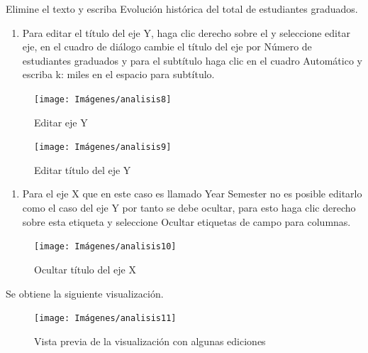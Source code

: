 \documentclass[
]{book}
\providecommand{\tightlist}{%
  \setlength{\itemsep}{0pt}\setlength{\parskip}{0pt}}
\begin{document}
Elimine el texto y escriba Evolución histórica del total de estudiantes graduados.

\begin{enumerate}
\def\labelenumi{\arabic{enumi}.}
\setcounter{enumi}{5}
\tightlist
\item
  Para editar el título del eje Y, haga clic derecho sobre el y seleccione editar eje, en el cuadro de diálogo cambie el título del eje por Número de estudiantes graduados y para el subtítulo haga clic en el cuadro Automático y escriba k: miles en el espacio para subtítulo.
\end{enumerate}

\begin{figure}

{\centering \texttt{[image: Imágenes/analisis8]} 

}

\caption{Editar eje Y}\label{fig:paso6-11lineas-fig}
\end{figure}

\begin{figure}

{\centering \texttt{[image: Imágenes/analisis9]} 

}

\caption{Editar título del eje Y}\label{fig:paso6-2lineas-fig}
\end{figure}

\begin{enumerate}
\def\labelenumi{\arabic{enumi}.}
\setcounter{enumi}{6}
\tightlist
\item
  Para el eje X que en este caso es llamado Year Semester no es posible editarlo como el caso del eje Y por tanto se debe ocultar, para esto haga clic derecho sobre esta etiqueta y seleccione Ocultar etiquetas de campo para columnas.
\end{enumerate}

\begin{figure}

{\centering \texttt{[image: Imágenes/analisis10]} 

}

\caption{Ocultar título del eje X}\label{fig:paso7lineas-fig}
\end{figure}

Se obtiene la siguiente visualización.

\begin{figure}

{\centering \texttt{[image: Imágenes/analisis11]} 

}

\caption{Vista previa de la visualización con algunas ediciones}\label{fig:paso7-1lineas-fig}
\end{figure}
\end{document}
